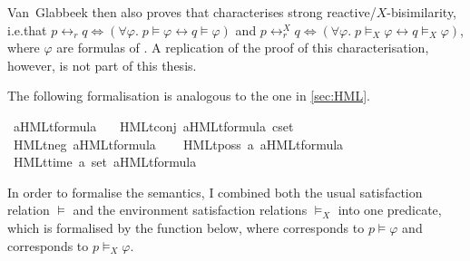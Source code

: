 \begin{isabellebody}
\begin{isamarkuptext}
Van~Glabbeek then also proves that \HMLt{} characterises strong reactive/$X$-bisimilarity, i.e.\@ that 
$p \leftrightarrow_r q \iff (\forall \varphi .\; p \vDash \varphi \longleftrightarrow q \vDash \varphi)$ and 
$p \leftrightarrow_r^X q \iff (\forall \varphi .\; p \vDash_X \varphi \longleftrightarrow q \vDash_X \varphi)$,
where $\varphi$ are formulas of \HMLt{}.
A replication of the proof of this characterisation, however, is not part of this thesis.%
\end{isamarkuptext}\isamarkuptrue%
%
\isadelimdocument
%
\endisadelimdocument
%
\isatagdocument
%
\isamarkuptrue%
%
\endisatagdocument
{\isafolddocument}%
%
\isadelimdocument
%
\endisadelimdocument
%
\begin{isamarkuptext}%
The following formalisation is analogous to the one in \cref{sec:HML}.%
\end{isamarkuptext}\isamarkuptrue%
\isamarkupfalse%
\ {\isacharparenleft}{\kern0pt}{\isacharprime}{\kern0pt}a{\isacharparenright}{\kern0pt}HMLt{\isacharunderscore}{\kern0pt}formula\ {\isacharequal}{\kern0pt}\isanewline
\ \ HMLt{\isacharunderscore}{\kern0pt}conj\ {\isacartoucheopen}{\isacharparenleft}{\kern0pt}{\isacharprime}{\kern0pt}a{\isacharparenright}{\kern0pt}HMLt{\isacharunderscore}{\kern0pt}formula\ cset{\isacartoucheclose}\ %
\isamarkupcmt{$\bigwedge \Phi$%
}\ \isanewline
{\isacharbar}{\kern0pt}\ HMLt{\isacharunderscore}{\kern0pt}neg\ {\isacartoucheopen}{\isacharparenleft}{\kern0pt}{\isacharprime}{\kern0pt}a{\isacharparenright}{\kern0pt}HMLt{\isacharunderscore}{\kern0pt}formula{\isacartoucheclose}\ %
\isamarkupcmt{$\neg\varphi$%
}\ \isanewline
{\isacharbar}{\kern0pt}\ HMLt{\isacharunderscore}{\kern0pt}poss\ {\isacartoucheopen}{\isacharprime}{\kern0pt}a{\isacartoucheclose}\ {\isacartoucheopen}{\isacharparenleft}{\kern0pt}{\isacharprime}{\kern0pt}a{\isacharparenright}{\kern0pt}HMLt{\isacharunderscore}{\kern0pt}formula{\isacartoucheclose}\ %
\isamarkupcmt{$\langle\alpha\rangle\varphi$%
}\ \isanewline
{\isacharbar}{\kern0pt}\ HMLt{\isacharunderscore}{\kern0pt}time\ {\isacartoucheopen}{\isacharprime}{\kern0pt}a\ set{\isacartoucheclose}\ {\isacartoucheopen}{\isacharparenleft}{\kern0pt}{\isacharprime}{\kern0pt}a{\isacharparenright}{\kern0pt}HMLt{\isacharunderscore}{\kern0pt}formula{\isacartoucheclose}\ %
\isanewline
%
\isadelimunimportant
%
\endisadelimunimportant
%
\isatagunimportant
%
\endisatagunimportant
{\isafoldunimportant}%
%
\isadelimunimportant
%
\endisadelimunimportant
%
\begin{isamarkuptext}%
In order to formalise the semantics, I combined both the usual satisfaction relation $\vDash$ and the environment satisfaction relations $\vDash_X$ into one predicate, which is formalised by the function  below, where  corresponds to $p \vDash \varphi$ and  corresponds to $p \vDash_X \varphi$. 


\end{isamarkuptext}
\end{isabellebody}
